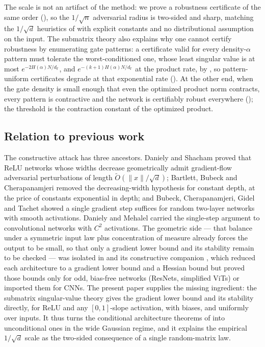 \documentclass[11pt,reqno]{amsart}
\theoremstyle{plain}
\theoremstyle{definition}
\theoremstyle{remark}
\newcommand{\F}{\mathbb{F}}
\newcommand{\dF}{d_{\F}}
\begin{document}
The scale is not an artifact of the method: we prove a robustness certificate of the same order
(), so the $1/\sqrt n$ adversarial radius is two-sided and sharp, matching the
$1/\sqrt d$ heuristics of \cite{shafahi19,fawzi18} with explicit constants and no distributional
assumption on the input. The submatrix theory also explains why one cannot certify robustness by
enumerating gate patterns: a certificate valid for every density-$\alpha$ pattern must tolerate the
worst-conditioned one, whose least singular value is at most $e^{-2H(\alpha)N/\dF}$, and
$e^{-(k+1)H(\alpha)N/\dF}$ at the product rate, by , so pattern-uniform certificates
degrade at that exponential rate (). At the other end, when the gate density is small
enough that even the
optimized product norm contracts, every pattern is contractive and the network is certifiably
robust everywhere (); the threshold is the contraction constant of the
optimized product.

\subsection{Relation to previous work}
The constructive attack has three ancestors. Daniely and Shacham \cite{danielyS20} proved that ReLU
networks whose widths decrease geometrically admit gradient-flow adversarial perturbations of length
$\tilde O(\|x\|/\sqrt d)$; Bartlett, Bubeck and Cherapanamjeri \cite{bartlettBC21} removed the
decreasing-width hypothesis for constant depth, at the price of constants exponential in depth; and
Bubeck, Cherapanamjeri, Gidel and Tachet \cite{bubeckCGT21} showed a single gradient step suffices
for random two-layer networks with smooth activations. Daniely and Mehalel \cite{danielyM26} carried
the single-step argument to convolutional networks with $C^2$ activations. The geometric side --- that
balance under a symmetric input law plus concentration of measure already forces the output to be
small, so that only a gradient lower bound and its stability remain to be checked --- was isolated in
\cite{shmaloAdv} and its constructive companion \cite{advExt}, which reduced each architecture to a
gradient lower bound and a Hessian bound but proved those bounds only for odd, bias-free networks
(ResNets, simplified ViTs) or imported them for CNNs. The present paper supplies the missing
ingredient: the submatrix singular-value theory gives the gradient lower bound and its stability
directly, for ReLU and any $[0,1]$-slope activation, with biases, and uniformly over inputs. It thus
turns the conditional architecture theorems of \cite{advExt} into unconditional ones in the wide
Gaussian regime, and it explains the empirical $1/\sqrt d$ scale as the two-sided consequence of a
single random-matrix law.
\end{document}
